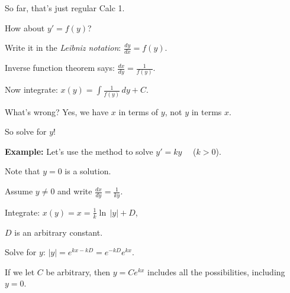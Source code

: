 \documentclass[10pt,aspectratio=169]{beamer}
\begin{document}
\begin{frame}
So far, that's just regular Calc 1.

\medskip
\pause

How about \quad
$y' = f(y)$\quad ?

\medskip
\pause

Write it in the \emph{Leibniz notation}:
\quad
$\displaystyle
\frac{dy}{dx} = f(y)$.

\medskip
\pause

Inverse function theorem says:
\quad
$\displaystyle
\frac{dx}{dy} = \frac{1}{f(y)}$.

\medskip
\pause

Now integrate:
\quad
$\displaystyle
x(y) = \int \frac{1}{f(y)} \,dy + C$.

\medskip
\pause

What's wrong?
\pause
Yes, we have $x$ in terms of $y$, not $y$ in terms $x$.

\pause
\medskip

So solve for $y$!
\end{frame}

\begin{frame}
\textbf{Example:}
Let's use the method to solve $y'=ky$ ~~($k > 0$).

\medskip
\pause

Note that $y=0$ is a solution.

\medskip
\pause

Assume $y\not= 0$ and write
\quad$\displaystyle
\frac{dx}{dy} = \frac{1}{ky}$.

\medskip
\pause

Integrate:
\quad
\quad$\displaystyle
x(y) = x = \frac{1}{k} \ln \, \lvert y \rvert + D$,

\medskip

$D$ is an arbitrary constant.

\medskip
\pause

Solve for $y$:
\quad
\quad$\displaystyle
\lvert y \rvert =
e^{kx-kD} = 
e^{-kD} e^{k x}$.

\medskip
\pause

If we let $C$ be arbitrary, then $y=Ce^{kx}$ includes all
the possibilities, including $y=0$.
\end{frame}
\end{document}
